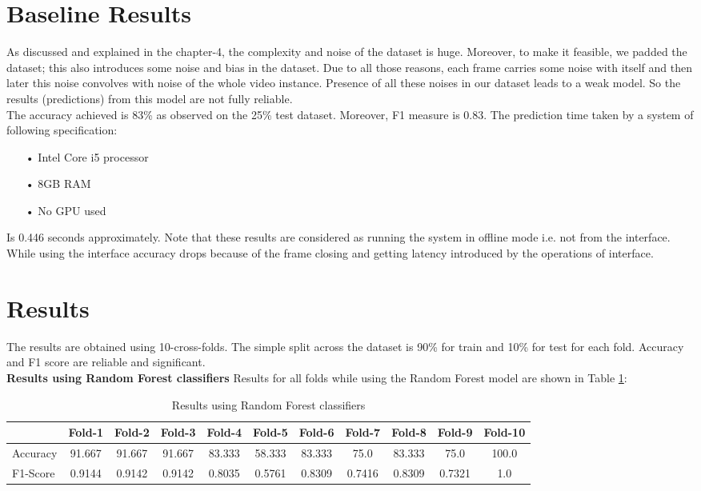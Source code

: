 \clearpage
\section{Baseline Results}
As discussed and explained in the chapter-4, the complexity and noise of the dataset is huge. Moreover, to make it feasible, we padded the dataset; this also introduces some noise and bias in the dataset. Due to all those reasons, each frame carries some noise with itself and then later this noise convolves with noise of the whole video instance. Presence of all these noises in our dataset leads to a weak model. So the results (predictions) from this model are not fully reliable.\\

The accuracy achieved is 83\% as observed on the 25\% test dataset. Moreover, F1 measure is 0.83.
The prediction time taken by a system of following specification:

\begin{enumerate}
	\item[•]Intel Core i5 processor
	\item[•]8GB RAM
	\item[•]No GPU used
\end{enumerate}

Is 0.446 seconds approximately.
Note that these results are considered as running the system in offline mode i.e. not from the interface. While using the interface accuracy drops because of the frame closing and getting latency introduced by the operations of interface.
\clearpage

\section{Results}
The results are obtained using 10-cross-folds. The simple split across the dataset is 90\% for train and 10\% for test for each fold. Accuracy and F1 score are reliable and significant.\\


\textbf{Results using Random Forest classifiers}
\hfil \break
Results for all folds while using the Random Forest model are shown in Table \ref{randomforest}:

\begin{table}[h]
	\begin{adjustbox}{max width=\textwidth}
		\begin{tabular}{ |p{1.7cm}|c|c|c|c|c|c|c|c|c|c|} 
			\hline
			&  Fold-1 &  Fold-2 &  Fold-3&  Fold-4&  Fold-5&  Fold-6 &  Fold-7	 &  Fold-8&  Fold-9 &  Fold-10     \\ 
			\hline
			Accuracy &  91.667   &  91.667   &  91.667   &  83.333  &  58.333  &  83.333   &  75.0	 &  83.333  &  75.0    &  100.0 \\ 
			\hline
			F1-Score &  0.9144   &  0.9142 &  0.9142&  0.8035&  0.5761&  0.8309     &  0.7416	 &  0.8309&  0.7321 &  1.0 \\ 
			\hline
		\end{tabular}
	\end{adjustbox}
	\caption{Results using Random Forest classifiers\label{randomforest}}
\end{table}

